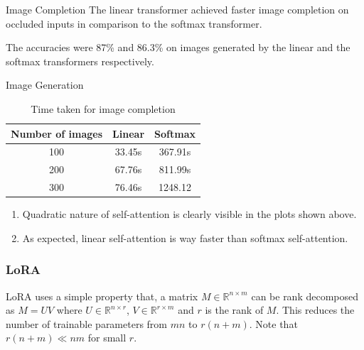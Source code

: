 \documentclass{beamer}
\begin{document}
    \begin{frame}{Image Completion}
        The {\color{red}linear transformer} achieved {\color{red}faster image completion} on occluded inputs in comparison to the {\color{red}softmax transformer}.
        
        
        The {\color{red}accuracies} were {\color{red}87\% and 86.3\%} on images generated by the linear and the softmax transformers respectively.
    \end{frame}
    
    \begin{frame}{Image Generation}
        \begin{table}[]
            \centering
            \begin{tabular}{|c|c|c|}
                \hline
                 Number of images& Linear & Softmax \\ \hline
                 100 & 33.45s & 367.91s \\ \hline
                 200 & 67.76s & 811.99s \\ \hline
                 300 & 76.46s & 1248.12 \\ \hline
            \end{tabular}
            \caption{Time taken for image completion}
        \end{table}

        \begin{enumerate}
            \item Quadratic nature of self-attention is clearly visible in the plots shown above.
            \item As expected, linear self-attention is way faster than softmax self-attention.
        \end{enumerate}
    \end{frame}
    
    
    \begin{frame}
    \frametitle{LoRA}
    LoRA uses a simple property that,
     a matrix $M \in \mathbb{R}^{n \times m}$ can be rank decomposed as $M = UV$ where $U \in \mathbb{R}^{n \times r}$, $V \in \mathbb{R}^{r \times m}$ and $r$ is the rank of $M$. This reduces the number of trainable parameters from $mn$ to $r(n + m)$. Note that $r(n + m) \ll nm$ for small $r$.
    \end{frame}
    
\end{document}
